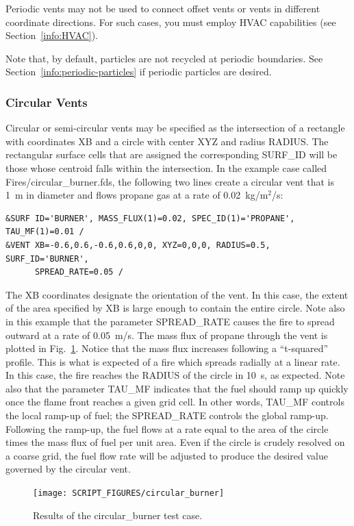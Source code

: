 \documentclass[11pt]{book}
\begin{document}
Periodic vents may not be used to connect offset vents or vents in different coordinate directions.  For such cases, you must employ HVAC capabilities (see Section~\ref{info:HVAC}).

Note that, by default, particles are not recycled at periodic boundaries.  See Section~\ref{info:periodic-particles} if periodic particles are desired.

\subsubsection{Circular Vents}
\label{sec:circvents}
\label{circular_burner}

Circular or semi-circular vents may be specified as the intersection of a rectangle with coordinates {\ct XB} and a circle with center {\ct XYZ} and radius {\ct RADIUS}.  The rectangular surface cells that are assigned the corresponding {\ct SURF\_ID} will be those whose centroid falls within the intersection. In the example case called {\ct Fires/circular\_burner.fds}, the following two lines create a circular vent that is 1~m in diameter and flows propane gas at a rate of 0.02~kg/m$^2$/s:
\begin{lstlisting}
&SURF ID='BURNER', MASS_FLUX(1)=0.02, SPEC_ID(1)='PROPANE', TAU_MF(1)=0.01 /
&VENT XB=-0.6,0.6,-0.6,0.6,0,0, XYZ=0,0,0, RADIUS=0.5, SURF_ID='BURNER',
      SPREAD_RATE=0.05 /
\end{lstlisting}
The {\ct XB} coordinates designate the orientation of the vent. In this case, the extent of the area specified by {\ct XB} is large enough to contain the entire circle. Note also in this example that the parameter {\ct SPREAD\_RATE} causes the fire to spread outward at a rate of 0.05~m/s. The mass flux of propane through the vent is plotted in Fig.~\ref{circ_burn}. Notice that the mass flux increases following a ``t-squared'' profile. This is what is expected of a fire which spreads radially at a linear rate. In this case, the fire reaches the {\ct RADIUS} of the circle in 10~s, as expected. Note also that the parameter {\ct TAU\_MF} indicates that the fuel should ramp up quickly once the flame front reaches a given grid cell. In other words, {\ct TAU\_MF} controls the local ramp-up of fuel; the {\ct SPREAD\_RATE} controls the global ramp-up. Following the ramp-up, the fuel flows at a rate equal to the area of the circle times the mass flux of fuel per unit area. Even if the circle is crudely resolved on a coarse grid, the fuel flow rate will be adjusted to produce the desired value governed by the circular vent.
\begin{figure}[h]
\begin{center}
\texttt{[image: SCRIPT\_FIGURES/circular\_burner]}
\caption[Results of the {\ct circular\_burner} test case]{Results of the {\ct circular\_burner} test case.}
\label{circ_burn}
\end{center}
\end{figure}
\end{document}
